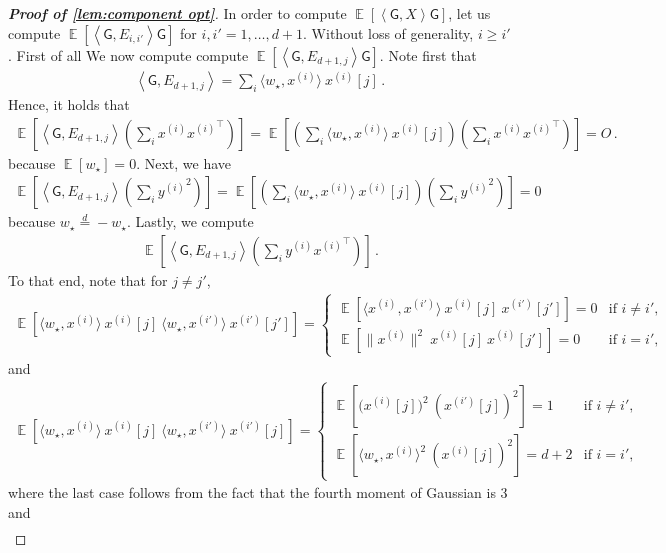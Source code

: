 \documentclass{article}
\DeclareMathOperator{\E}{\mathbb{E}}
\newcommand{\wstar}{w_\star}
\newcommand{\tx}[1]{x^{(#1)}}
\newcommand{\ty}[1]{y^{(#1)}}
\newcommand{\MM}{\mathsf{G}}
\newcommand{\inp}[2]{\left \langle #1,#2\right\rangle}
\begin{document}
\begin{proof}[{\bf Proof of \autoref{lem:component opt}}]
In order to compute $\E \left[ \inp{\MM}{X} \MM \right]$, let us compute $\E \left[ \inp{\MM}{E_{i,i'}} \MM \right]$ for $i, i' = 1,\dots, d+1$.
Without loss of generality, $i\geq i'$.
First of all 
We now compute   compute $\E \left[ \inp{\MM}{E_{d+1,j}} \MM \right]$.
Note first that 
\begin{align}
\inp{\MM}{E_{d+1,j}} = \sum_i\langle{\wstar}, \tx{i} \rangle \ {\tx{i}}[j]\,.
\end{align}
Hence, it holds that
\begin{align}
\E\left[  \inp{\MM}{E_{d+1,j}} \left(\sum_i {\tx{i}}{\tx{i}}^\top\right)\right]
= \E\left[\left(\sum_i\langle{\wstar}, \tx{i} \rangle  \ {\tx{i}}[j]\right) \left(\sum_i {\tx{i}}{\tx{i}}^\top\right)\right] =O\,.    
\end{align}
because $\E[\wstar]=0$.
Next, we have 
\begin{align}
\E \left[  \inp{\MM}{E_{d+1,j}}\left(\sum_i{\ty{i}}^2\right) \right]    =  \E\left[ \left(\sum_i \langle{\wstar}, \tx{i} \rangle  \ {\tx{i}}[j]\right) \left(\sum_i{\ty{i}}^2\right)\right] =0
\end{align} because $\wstar \overset{d}{=} -\wstar$.
Lastly, we compute 
\begin{align}
\E\left[  \inp{\MM}{E_{d+1,j}} \left(\sum_i {\ty{i}}{\tx{i}}^\top\right)\right]\,.
\end{align}
To that end, note that for $j\neq j'$,
\begin{align}
\E\left[\langle{\wstar}, \tx{i}  \rangle   \ {\tx{i}}[j] \ \langle{\wstar},{\tx{i'}}\rangle \ \tx{i'} [j'] \right] = \begin{cases}
\E[\langle \tx{i},\tx{i'} \rangle \ {\tx{i}}[j] \  \tx{i'}[j']]= 0 &\text{if }i\neq i',\\
\E[\|\tx{i}\|^2 \ {\tx{i}}[j] \  {\tx{i}}[j']]= 0 &\text{if }i=i',
\end{cases}
\end{align}
and
\begin{align} \label{exp:cross}    \E\left[\langle{\wstar}, \tx{i} \rangle \ {\tx{i}}[j] 
\ \langle \wstar,\tx{i'}\rangle \ \tx{i'} [j] \right] = \begin{cases}
\E[{(\tx{i}}[j])^2 \ (\tx{i'}[j])^2]= 1&\text{if }i\neq i',\\
\E\left[\langle{\wstar}, \tx{i}  \rangle^2  \ ({\tx{i}}[j])^2\right]= d+2&\text{if }i=i',
\end{cases}
\end{align}
where the last case follows from the fact that the fourth moment of Gaussian is $3$ and
\begin{align}

\end{align}
\end{proof}
\end{document}

